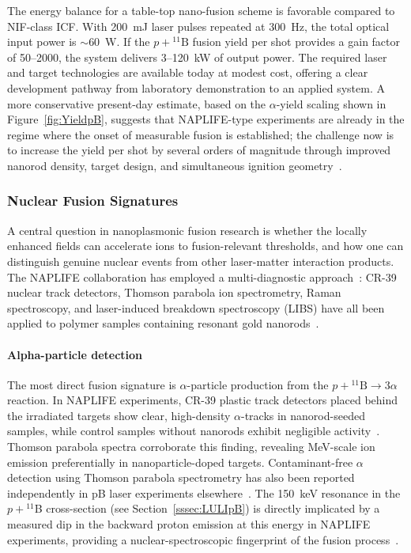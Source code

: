 \documentclass[particles,article,accept,pdftex,moreauthors]{Definitions/mdpi}
\begin{document}
The energy balance for a table-top nano-fusion scheme is favorable compared to NIF-class ICF. With 200~mJ laser pulses repeated at 300~Hz, the total optical input power is $\sim$60~W. If the $p+{}^{11}\mathrm{B}$ fusion yield per shot provides a gain factor of 50--2000, the system delivers 3--120~kW of output power. The required laser and target technologies are available today at modest cost, offering a clear development pathway from laboratory demonstration to an applied system. A more conservative present-day estimate, based on the $\alpha$-yield scaling shown in Figure~\ref{fig:YieldpB}, suggests that NAPLIFE-type experiments are already in the regime where the onset of measurable fusion is established; the challenge now is to increase the yield per shot by several orders of magnitude through improved nanorod density, target design, and simultaneous ignition geometry~\cite{Csernai:2026MDPI,Csernai:2024Universe}.


\subsubsection{Nuclear Fusion Signatures}\label{sssec:FusionSigs}

A central question in nanoplasmonic fusion research is whether the locally enhanced fields can accelerate ions to fusion-relevant thresholds, and how one can distinguish genuine nuclear events from other laser-matter interaction products. The NAPLIFE collaboration has employed a multi-diagnostic approach~\cite{mcnamee2025contaminant,Csernai:2023PRE}: CR-39 nuclear track detectors, Thomson parabola ion spectrometry, Raman spectroscopy, and laser-induced breakdown spectroscopy (LIBS) have all been applied to polymer samples containing resonant gold nanorods~\cite{tamas2025nanofusion,Kroo2024pB}.

\paragraph*{\bf Alpha-particle detection}
The most direct fusion signature is $\alpha$-particle production from the $p+{}^{11}\mathrm{B}\to 3\alpha$ reaction. In NAPLIFE experiments, CR-39 plastic track detectors placed behind the irradiated targets show clear, high-density $\alpha$-tracks in nanorod-seeded samples, while control samples without nanorods exhibit negligible activity~\cite{Kroo2024pB}. Thomson parabola spectra corroborate this finding, revealing MeV-scale ion emission preferentially in nanoparticle-doped targets. Contaminant-free $\alpha$ detection using Thomson parabola spectrometry has also been reported independently in pB laser experiments elsewhere~\cite{mcnamee2025contaminant}. The 150~keV resonance in the $p+{}^{11}$B cross-section (see Section~\ref{sssec:LULIpB}) is directly implicated by a measured dip in the backward proton emission at this energy in NAPLIFE experiments, providing a nuclear-spectroscopic fingerprint of the fusion process~\cite{Kroo2024pB}.
\end{document}
